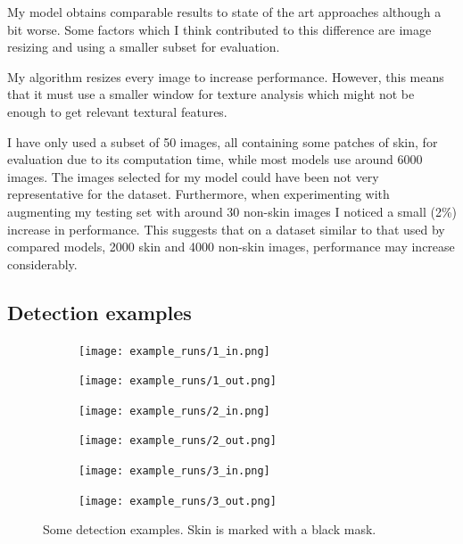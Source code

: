 \documentclass[12pt]{report}
\begin{document}
	My model obtains comparable results to state of the art approaches although a bit worse. Some factors which I think contributed to this difference are image resizing and using a smaller subset for evaluation. 
	
	My algorithm resizes every image to increase performance. However, this means that it must use a smaller window for texture analysis which might not be enough to get relevant textural features.
	
	I have only used a subset of 50 images, all containing some patches of skin, for evaluation due to its computation time, while most models use around 6000 images. The images selected for my model could have been not very representative for the dataset. Furthermore, when experimenting with augmenting my testing set with around 30 non-skin images I noticed a small (2\%) increase in performance. This suggests that on a dataset similar to that used by compared models, 2000 skin and 4000 non-skin images, performance may increase considerably.
	
	\newpage
	\subsection{Detection examples}
	\begin{figure}[h!]
		\centering
		\begin{subfigure}[b]{0.4\linewidth}
			\texttt{[image: example\_runs/1\_in.png]}
		\end{subfigure}
		\begin{subfigure}[b]{0.4\linewidth}
			\texttt{[image: example\_runs/1\_out.png]}
		\end{subfigure}
		
		
		\begin{subfigure}[b]{0.4\linewidth}
			\texttt{[image: example\_runs/2\_in.png]}
		\end{subfigure}
		\begin{subfigure}[b]{0.4\linewidth}
			\texttt{[image: example\_runs/2\_out.png]}
		\end{subfigure}
		
		\begin{subfigure}[b]{0.4\linewidth}
			\texttt{[image: example\_runs/3\_in.png]}
		\end{subfigure}
		\begin{subfigure}[b]{0.4\linewidth}
			\texttt{[image: example\_runs/3\_out.png]}
		\end{subfigure}
		
		\caption{Some detection examples. Skin is marked with a black mask.}
		\label{fig:example_detection}
	\end{figure}
	
\end{document}

